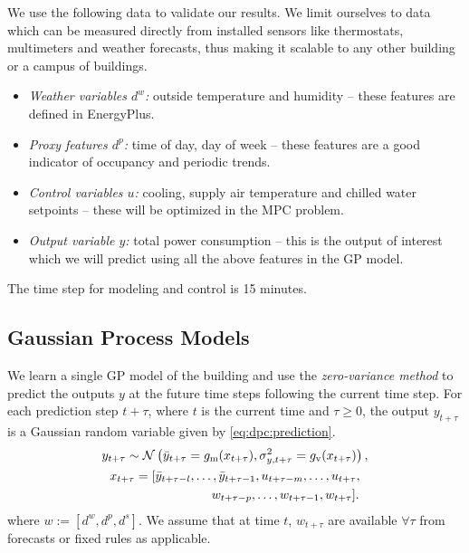 We use the following data to validate our results. We limit ourselves to data which can be measured directly from installed sensors like thermostats, multimeters and weather forecasts, thus making it scalable to any other building or a campus of buildings.

\begin{itemize}
\item \textit{Weather variables \(d^w\):} outside temperature and humidity -- these features are defined in EnergyPlus.
\item \textit{Proxy features \(d^p\):} time of day, day of week -- these features are a good indicator of occupancy and periodic trends.
\item \textit{Control variables \(u\):} cooling, supply air temperature and chilled water setpoints -- these will be optimized in the MPC problem. %
\item \textit{Output variable \(y\):} total power consumption -- this is the output of interest which we will predict using all the above features in the GP model.
\end{itemize}

The time step for modeling and control is 15 minutes.

\subsection{Gaussian Process Models}
\label{SS:casestudy:gp}

We learn a single GP model of the building and use the \emph{zero-variance method} to predict the outputs \(y\) at the future time steps following the current time step.
For each prediction step $t+\tau$, where $t$ is the current time and \( \tau \ge 0\), %
the output \(y_{t+\tau}\) is a Gaussian random variable given by \eqref{eq:dpc:prediction}.
\begin{gather}
\label{E:gp:casestudy}
y_{t+\tau} \sim \GaussianDist{\bar{y}_{t+\tau} = g_{\mathrm m}(x_{t+\tau})}{\sigma^2_{y, t+\tau} = g_{\mathrm v}(x_{t+\tau})}, \\
x_{t + \tau} = [\bar y_{t+ \tau-l}, \dots, \bar y_{t+ \tau-1}, u_{t+ \tau-m}, \dots, u_{t+ \tau}, \nonumber \\
\qquad\qquad\qquad\qquad  w_{t+ \tau-p}, \dots, w_{t+ \tau-1}, w_{t+ \tau}]\text. \nonumber
\end{gather}
where \(w:=[d^w, d^p, d^s]\). We assume that at time \(t\), \(w_{t+\tau}\) are available \(\forall \tau \) from forecasts or fixed rules as applicable.

